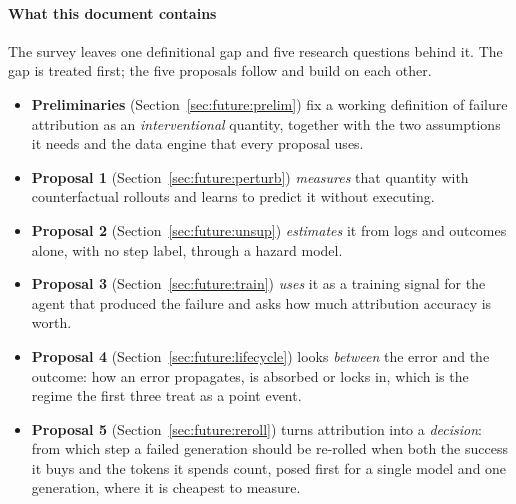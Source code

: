 \paragraph{What this document contains} The survey leaves one definitional gap and five research questions behind it. The gap is treated first; the five proposals follow and build on each other.
\begin{itemize}[leftmargin=1.1em]
\item \textbf{Preliminaries} (Section~\ref{sec:future:prelim}) fix a working definition of failure attribution as an \emph{interventional} quantity, together with the two assumptions it needs and the data engine that every proposal uses.
\item \textbf{Proposal 1} (Section~\ref{sec:future:perturb}) \emph{measures} that quantity with counterfactual rollouts and learns to predict it without executing.
\item \textbf{Proposal 2} (Section~\ref{sec:future:unsup}) \emph{estimates} it from logs and outcomes alone, with no step label, through a hazard model.
\item \textbf{Proposal 3} (Section~\ref{sec:future:train}) \emph{uses} it as a training signal for the agent that produced the failure and asks how much attribution accuracy is worth.
\item \textbf{Proposal 4} (Section~\ref{sec:future:lifecycle}) looks \emph{between} the error and the outcome: how an error propagates, is absorbed or locks in, which is the regime the first three treat as a point event.
\item \textbf{Proposal 5} (Section~\ref{sec:future:reroll}) turns attribution into a \emph{decision}: from which step a failed generation should be re-rolled when both the success it buys and the tokens it spends count, posed first for a single model and one generation, where it is cheapest to measure.
\end{itemize}


